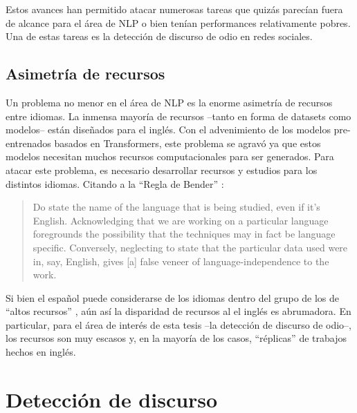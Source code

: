 Estos avances han permitido atacar numerosas tareas que quizás parecían fuera de alcance para el área de NLP o bien tenían performances relativamente pobres. Una de estas tareas es la detección de discurso de odio en redes sociales. 

\subsection{Asimetría de recursos}

Un problema no menor en el área de NLP es la enorme asimetría de recursos entre idiomas. La inmensa mayoría de recursos --tanto en forma de datasets como modelos-- están diseñados para el inglés. Con el advenimiento de los modelos pre-entrenados basados en Transformers, este problema se agravó ya que estos modelos necesitan muchos recursos computacionales para ser generados. Para atacar este problema, es necesario desarrollar recursos y estudios para los distintos idiomas. Citando a la ``Regla de Bender'' \cite{bender2011achieving}:

\begin{quote}
    Do state the name of the language that is being studied, even if it's English. Acknowledging that we are working on a particular language foregrounds the possibility that the techniques may in fact be language specific. Conversely, neglecting to state that the particular data used were in, say, English, gives [a] false veneer of language-independence to the work.
\end{quote}

Si bien el español puede considerarse de los idiomas dentro del grupo de los de ``altos recursos'' \cite{bender2019rule}, aún así la disparidad de recursos al el inglés es abrumadora. En particular, para el área de interés de esta tesis --la detección de discurso de odio--, los recursos son muy escasos y, en la mayoría de los casos, ``réplicas'' de trabajos hechos en inglés.

\section{Detección de discurso}

%
%
%
%


